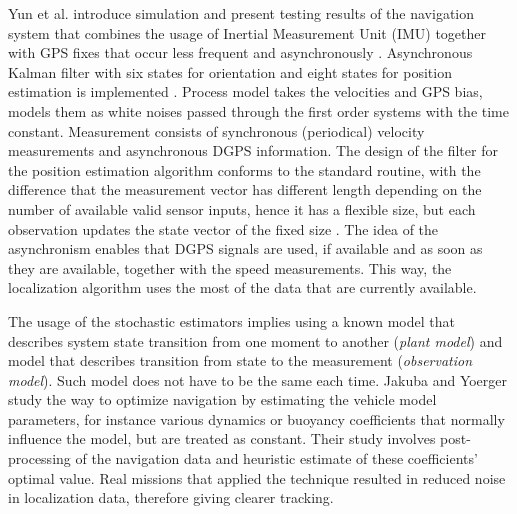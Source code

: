 Yun et al. introduce simulation and present testing results of the navigation system that combines the usage of Inertial Measurement Unit (IMU) together with GPS fixes that occur less frequent and asynchronously \cite{yun00}. Asynchronous Kalman filter with six states for orientation and eight states for position estimation is implemented \cite{yun00}. Process model takes the velocities and GPS bias, models them as white noises passed through the first order systems with the time constant. Measurement consists of synchronous (periodical) velocity measurements and asynchronous DGPS information. The design of the filter for the position estimation algorithm conforms to the standard routine, with the difference that the measurement vector has different length depending on the number of available valid sensor inputs, hence it has a flexible size, but each observation updates the state vector of the fixed size \cite{yun00}. The idea of the asynchronism enables that DGPS signals are used, if available and as soon as they are available, together with the speed measurements. This way, the localization algorithm uses the most of the data that are currently available.

The usage of the stochastic estimators implies using a known model that describes system state transition from one moment to another (\textit{plant model}) and model that describes transition from state to the measurement (\textit{observation model}). Such model does not have to be the same each time. Jakuba and Yoerger \cite{jakuba03} study the way to optimize navigation by estimating the vehicle model parameters, for instance various dynamics or buoyancy coefficients that normally influence the model, but are treated as constant. Their study involves post-processing of the navigation data and heuristic estimate of these coefficients' optimal value. Real missions that applied the technique resulted in reduced noise in localization data, therefore giving clearer tracking. 

